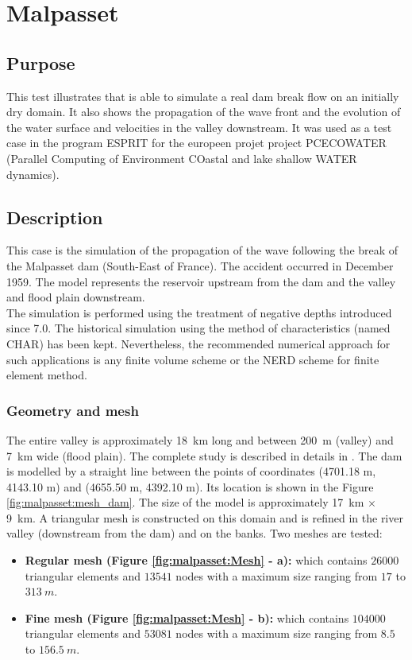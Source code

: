 \chapter{Malpasset}
\section{Purpose}
%
This test illustrates that  is able to simulate a real dam break flow
on an initially dry domain. It also shows the propagation of the wave front
and the evolution of the water surface and velocities in the valley downstream.
It was used as a test case in the program ESPRIT for the europeen projet project
PCECOWATER (Parallel Computing of Environment COastal and lake shallow WATER dynamics).
%
\section{Description}
%
This case is the simulation of the propagation of the wave following the break of the Malpasset dam (South-East of France). The accident occurred in December 1959. The model represents the reservoir upstream from the dam and the valley and flood plain downstream. \\

The simulation is performed using the treatment of negative depths introduced since  7.0. The historical simulation using the method of characteristics (named CHAR) has been kept. Nevertheless, the recommended numerical approach for such applications is any finite volume scheme or the NERD scheme for finite element method.

\subsection{Geometry and mesh}
The entire valley is approximately 18~km long and between 200~m (valley) and 7~km wide (flood plain). The complete study is described in details in \cite{Hervouet2007}.
The dam is modelled by a straight line between the points of coordinates (4701.18 m, 4143.10 m) and (4655.50 m, 4392.10 m). Its location is shown in the Figure \ref{fig:malpasset:mesh_dam}.
The size of the model is approximately  17~km $\times$ 9~km. A triangular mesh is constructed on this domain and is refined in the river valley (downstream from the dam) and on the banks. 
Two meshes are tested:
\begin{itemize}
\item \textbf{Regular mesh (Figure \ref{fig:malpasset:Mesh} - a):}
which contains $26000$ triangular elements and $13541$ nodes with a maximum size ranging from $17$ to $313~m$.\\
\item \textbf{Fine mesh (Figure \ref{fig:malpasset:Mesh} - b):}
which contains $104000$ triangular elements and $53081$ nodes with a maximum size ranging from $8.5$ to $156.5~m$.
\end{itemize}

